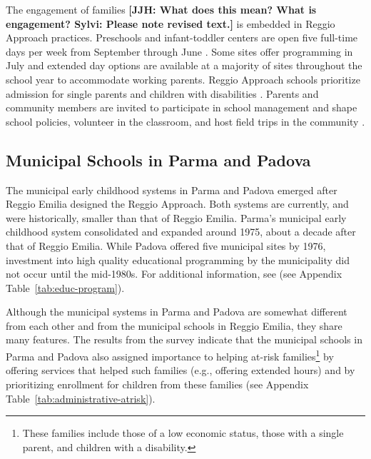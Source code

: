 The engagement of families \textbf{[JJH: What does this mean? What is engagement? Sylvi: Please note revised text.]} is embedded in Reggio Approach practices. Preschools and infant-toddler centers are open five full-time days per week from September through June \citep{Giudici-Nicolosi_2014_Reggio-Approach}. Some sites offer programming in July and extended day options are available at a majority of sites throughout the school year to accommodate working parents. Reggio Approach schools prioritize admission for single parents and children with disabilities \citep{Edwards-etal-eds_1998_Hundred-Languages}. Parents and community members are invited to participate in school management and shape school policies, volunteer in the classroom, and host field trips in the community \citep{CEHD_2016_Historical-Analysis,Cagliari-etal-eds_2016_BOOK_Loris-Malaguzzi}. 

\subsection{Municipal Schools in Parma and Padova}

The municipal early childhood systems in Parma and Padova emerged after Reggio Emilia designed the Reggio Approach. Both systems are currently, and were historically, smaller than that of Reggio Emilia. Parma's municipal early childhood system consolidated and expanded around 1975, about a decade after that of Reggio Emilia. While Padova offered five municipal sites by 1976, investment into high quality educational programming by the municipality did not occur until the mid-1980s. For additional information, see (see Appendix Table~\ref{tab:educ-program}). 

Although the municipal systems in Parma and Padova are somewhat different from each other and from the municipal schools in Reggio Emilia, they share many features. The results from the survey indicate that the municipal schools in Parma and Padova also assigned importance to helping at-risk families\footnote{These families include those of a low economic status, those with a single parent, and children with a disability.} by offering services that helped such families (e.g., offering extended hours) and by prioritizing enrollment for children from these families (see Appendix Table~\ref{tab:administrative-atrisk}). 

